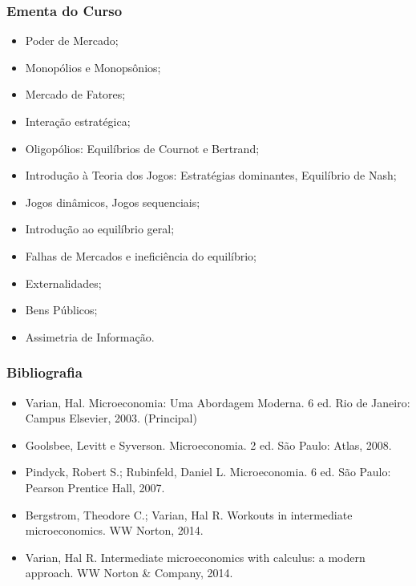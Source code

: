 \documentclass{beamer}[10]
\begin{document}
\begin{frame}
	\frametitle{Ementa do Curso}
	\begin{itemize}
		\item Poder de Mercado;
		\item Monopólios e Monopsônios;
		\item Mercado de Fatores;
		\item Interação estratégica;
		\item Oligopólios: Equilíbrios de Cournot e Bertrand;
		\item Introdução à Teoria dos Jogos: Estratégias dominantes, Equilíbrio de Nash;
		\item Jogos dinâmicos, Jogos sequenciais;
		\item Introdução ao equilíbrio geral;
		\item Falhas de Mercados e ineficiência do equilíbrio;
		\item Externalidades;
		\item Bens Públicos;
		\item Assimetria de Informação.
	\end{itemize}
\end{frame}

\begin{frame}
	\frametitle{Bibliografia}
	\begin{itemize}
		\item Varian, Hal. Microeconomia: Uma Abordagem Moderna. 6 ed. Rio de Janeiro: Campus Elsevier, 2003. (Principal)
		\item Goolsbee, Levitt e Syverson. Microeconomia. 2 ed. São Paulo: Atlas, 2008.
		\item Pindyck, Robert S.; Rubinfeld, Daniel L. Microeconomia. 6 ed. São Paulo: Pearson Prentice Hall, 2007.
		\item Bergstrom, Theodore C.; Varian, Hal R. Workouts in intermediate microeconomics. WW Norton, 2014.
		\item Varian, Hal R. Intermediate microeconomics with calculus: a modern approach. WW Norton \& Company, 2014.
	\end{itemize}
\end{frame}
\end{document}
